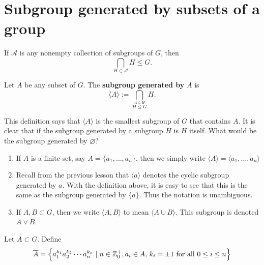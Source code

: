\documentclass[11pt,a4paper]{article}
\begin{document}
\def\contador{Lesson 8}



\section{Subgroup generated by subsets of a group}

\begin{prop}
    If \(\mathcal{A}\) is any nonempty collection of subgroups of \(G\), then 
    \[\bigcap_{H\in \mathcal{A}} H \leq G.\]
\end{prop}



\begin{defi}
Let \(A\) be any subset of \(G\).
The \textbf{subgroup generated by} \(A\) is 
\[\langle A\rangle := \bigcap_{\stackrel{A\subseteq H }{H\leq G }  } H .\]
\end{defi}

This definition says that \(\langle A\rangle \) is the smallest subgroup of \(G\) that contains \(A\). 
It is clear that if the subgroup generated by a subgroup \(H\) is \(H\) itself. 
What would be the subgroup generated by \(\varnothing\)?


\begin{rem}
\begin{enumerate}[label=(\roman*)]
    \item      If \(A \) is a finite set, say \(A = \{a_1, \ldots, a_n \}\),
    then we simply write \(\langle A\rangle = \langle a_1, \ldots, a_n \rangle \)

    \item Recall from the previous lesson that \(\langle a\rangle\) denotes the cyclic subgroup generated by \(a\).
    With the definition above, it is easy to see that this is the same as the subgroup generated by \(\{a\}\).
    Thus the notation is unambiguous.

    \item If \(A,B\subset G\), then we write  \(\langle A, B \rangle\) to mean  \(\langle A\cup B\rangle \).
    This subgroup is denoted \(A \vee B\). 
\end{enumerate}
\end{rem}
 
\begin{defi}
    Let \(A\subset G\).
    Define 
    \[\overline{A} = \left\{ a_1^{k_1} a_2^{k_2} \cdots a_{n}^{k_n} \mid n\in \mathbb{Z}_0^+, a_i \in A ,\, k_i = \pm 1 \text{ for all } 0 \leq i\leq n \right\}\]
\end{defi}
\end{document}
